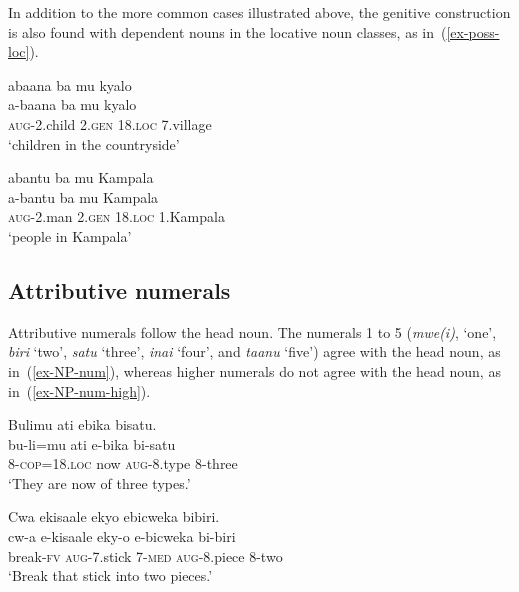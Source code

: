 \z

In addition to the more common cases illustrated above, the genitive construction is also found with dependent nouns in the locative noun classes, as in~(\ref{ex-poss-loc}).

\ea \label{ex-poss-loc}
    \begin{xlist}	
    \ex \label{ex-poss-loca}
    \glll abaana ba mu kyalo\\
    a-baana		ba	mu		kyalo\\
 	\textsc{aug}-2.child		2.\textsc{gen}	18.\textsc{loc}	7.village\\
    \glt  ‘children in the countryside’
        
    \ex \label{ex-poss-locb}
    \glll	 abantu	ba	mu		Kampala\\
    a-bantu	ba	mu		Kampala\\
	 \textsc{aug}-2.man	2.\textsc{gen}	18.\textsc{loc}	1.Kampala\\
    \glt ‘people in Kampala’
     \end{xlist}	
\z


\subsection{Attributive numerals}\label{sec-NP-numerals}

Attributive numerals follow the head noun.
The numerals 1 to 5 (\emph{mwe(i)}, `one', \emph{biri} `two', \emph{satu} `three', \emph{inai} `four', and \emph{taanu} `five') agree with the head noun, as in~(\ref{ex-NP-num}), whereas higher numerals do not agree with the head noun, as in~(\ref{ex-NP-num-high}).

\ea \label{ex-NP-num}
\begin{xlist}
\ex 	\label{ex-NP-num1}
	\glll	Bulimu ati ebika bisatu.\\
		bu-li=mu ati e-bika bi-satu\\
		8-\textsc{cop}=18.\textsc{loc} now \textsc{aug}-8.type 8-three\\
	\glt ‘They are now of three types.’

\ex 	\label{ex-NP-num2}
	\glll  Cwa ekisaale ekyo ebicweka bibiri.\\
	cw-a e-kisaale eky-o e-bicweka bi-biri\\
		break-\textsc{fv} \textsc{aug}-7.stick 7-\textsc{med} \textsc{aug}-8.piece 8-two\\
\glt ‘Break that stick into two pieces.’
\end{xlist}
\z

